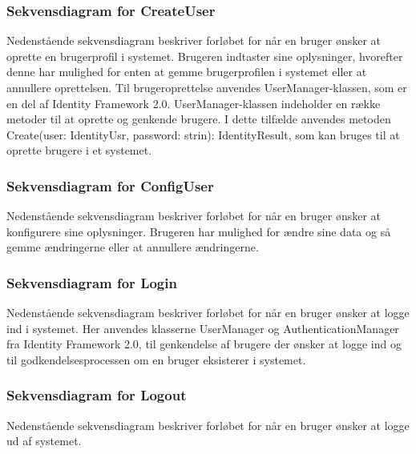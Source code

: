 
\subsubsection{Sekvensdiagram for CreateUser}
Nedenstående sekvensdiagram beskriver forløbet for når en bruger ønsker at oprette en brugerprofil i systemet. Brugeren indtaster sine oplysninger, hvorefter denne har mulighed for enten at gemme brugerprofilen i systemet eller at annullere oprettelsen. Til brugeroprettelse anvendes UserManager-klassen, som er en del af Identity Framework 2.0. UserManager-klassen indeholder en række metoder til at oprette og genkende brugere. I dette tilfælde anvendes metoden Create(user: IdentityUsr, password: strin): IdentityResult, som kan bruges til at oprette brugere i et systemet.


\subsubsection{Sekvensdiagram for ConfigUser}
Nedenstående sekvensdiagram beskriver forløbet for når en bruger ønsker at konfigurere sine oplysninger. Brugeren har mulighed for ændre sine data og så gemme ændringerne eller at annullere ændringerne.


\subsubsection{Sekvensdiagram for Login}
Nedenstående sekvensdiagram beskriver forløbet for når en bruger ønsker at logge ind i systemet. Her anvendes klasserne UserManager og AuthenticationManager fra Identity Framework 2.0, til genkendelse af brugere der ønsker at logge ind og til godkendelsesprocessen om en bruger eksisterer i systemet.


\subsubsection{Sekvensdiagram for Logout}
Nedenstående sekvensdiagram beskriver forløbet for når en bruger ønsker at logge ud af systemet.

